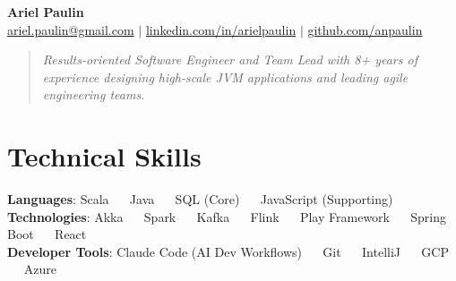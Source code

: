 \documentclass[letterpaper,11pt]{article}
\begin{document}

\begin{center}
    \textbf{\Huge Ariel Paulin} \\ \vspace{2pt}
    \small{
    \href{mailto:ariel.paulin@gmail.com}{ariel.paulin@gmail.com} $|$ 
    \href{https://www.linkedin.com/in/arielpaulin}{linkedin.com/in/arielpaulin} $|$
    \href{https://github.com/anpaulin}{github.com/anpaulin}
    }
    \vspace{2pt}
\end{center}
\begin{quote}
    \vspace{2pt}
    \small\textit{Results-oriented Software Engineer and Team Lead with 8+ years of experience designing high-scale JVM applications and leading agile engineering teams.}
    \vspace{-5pt}
\end{quote}

%
\section{Technical Skills}
\begin{itemize}[leftmargin=0.15in, label={}]
  \small{\item{
    \textbf{Languages}: \quad Scala \ \textbf{\textbar} \ Java \ \textbf{\textbar} \ SQL \textnormal{(Core)} \ \textbf{\textbar} \ JavaScript \textnormal{(Supporting)} \\
    \textbf{Technologies}: \quad Akka \ \textbf{\textbar} \ Spark \ \textbf{\textbar} \ Kafka \ \textbf{\textbar} \ Flink \ \textbf{\textbar} \ Play Framework \ \textbf{\textbar} \ Spring Boot \ \textbf{\textbar} \ React \\
    \textbf{Developer Tools}: \quad Claude Code (AI Dev Workflows) \ \textbf{\textbar} \ Git \ \textbf{\textbar} \ IntelliJ \ \textbf{\textbar} \ GCP \ \textbf{\textbar} \ Azure
  }}
\end{itemize}
\end{document}
